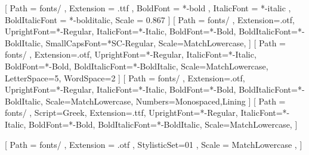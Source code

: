 % 
%
\setmainfont{serif}[
  Path = fonts/ ,
  Extension = .ttf ,
  BoldFont = *-bold ,
  ItalicFont = *-italic ,
  BoldItalicFont = *-bolditalic,
  Scale = 0.867
]
\setsansfont{AlegreyaSans}[
  Path = fonts/ ,
  Extension=.otf,
  UprightFont=*-Regular,
  ItalicFont=*-Italic,
  BoldFont=*-Bold,
  BoldItalicFont=*-BoldItalic,
  SmallCapsFont=*SC-Regular,
  Scale=MatchLowercase,
]
[
  Path = fonts/ ,
  Extension=.otf,
  UprightFont=*-Regular,
  ItalicFont=*-Italic,
  BoldFont=*-Bold,
  BoldItalicFont=*-BoldItalic,
  Scale=MatchLowercase,
  LetterSpace=5,
  WordSpace=2
]
[
  Path = fonts/ ,
  Extension=.otf,
  UprightFont=*-Regular,
  ItalicFont=*-Italic,
  BoldFont=*-Bold,
  BoldItalicFont=*-BoldItalic,
  Scale=MatchLowercase,
  Numbers={Monospaced,Lining}
]
[
  Path = fonts/ ,
  Script=Greek,
  Extension=.ttf,
  UprightFont=*-Regular,
  ItalicFont=*-Italic,
  BoldFont=*-Bold,
  BoldItalicFont=*-BoldItalic,
  Scale=MatchLowercase,
]

% 
%

\usepackage{unicode-math}

[%
  Path = fonts/ ,
  Extension = .otf ,
  StylisticSet=01 ,
  Scale = MatchLowercase ,
]